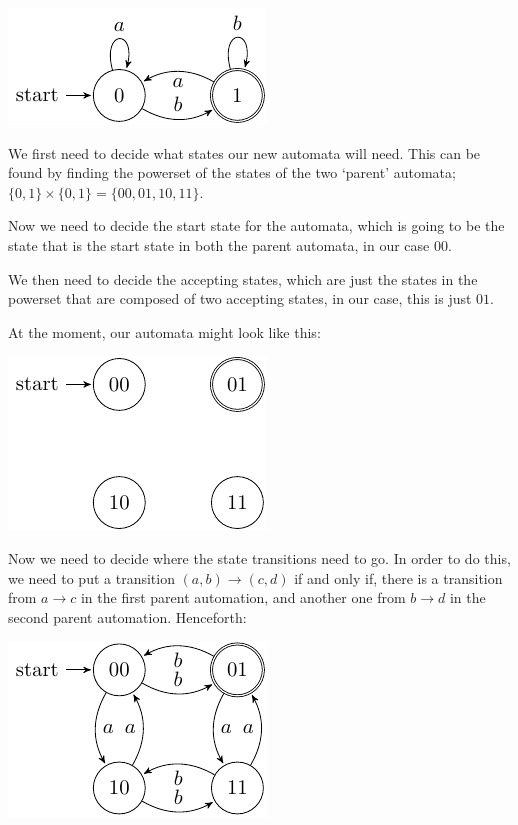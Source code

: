 \begin{center}
  \includegraphics{automata/29.pdf}
\end{center}

We first need to decide what states our new automata will need. This can be
found by finding the powerset of the states of the two `parent' automata;
$\{0,1\} \times \{0,1\} = \{00,01,10,11\}$.

Now we need to decide the start state for the automata, which is going to be the
state that is the start state in both the parent automata, in our case $00$.


We then need to decide the accepting states, which are just the states in the
powerset that are composed of two accepting states, in our case, this is just
$01$.

At the moment, our automata might look like this:

\begin{center}
  \includegraphics{automata/30.pdf}
\end{center}

Now we need to decide where the state transitions need to go. In order to do
this, we need to put a transition $(a,b) \rightarrow (c,d)$ if and only if,
there is a transition from $a \rightarrow c$ in the first parent automation, and
another one from $b \rightarrow d$ in the second parent automation. Henceforth:

\begin{center}
  \includegraphics{automata/31.pdf}
\end{center}

